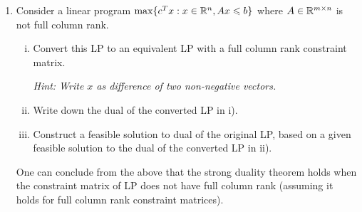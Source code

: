 \documentclass[11pt]{article}
\renewcommand{\leq}{\leqslant}
\begin{document}
\begin{enumerate}[1)]


\item Consider a linear program $\max\{c^Tx: x\in \R^n, Ax\leq b\}$ where $A\in \mathbb{R}^{m\times n}$ is not full column rank. 
\begin{enumerate}[i)]
\item Convert this LP to an equivalent LP with a full column rank constraint matrix. 

\emph{Hint: Write $x$ as difference of two non-negative vectors.}

\item Write down the dual of the converted LP in i).
\item Construct a feasible solution to dual of the original LP, based on a given feasible solution to the dual of the converted LP in ii).
\end{enumerate}
One can conclude from the above that the strong duality theorem holds when the constraint matrix of LP does not have full column rank (assuming it holds for full column rank constraint matrices).


\end{enumerate}
\end{document}
